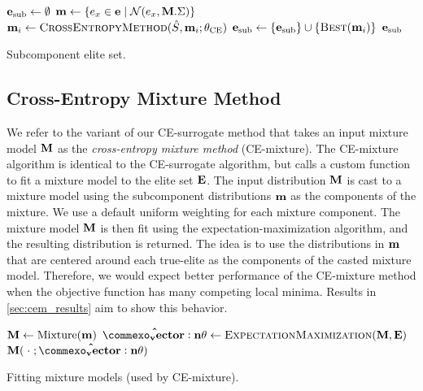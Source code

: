 \begin{algorithm}[ht]
  \begin{algorithmic}
    \State $\mathbf{e}_\text{sub} \leftarrow \emptyset$
    \State $\mathbf{m} \leftarrow \{ e_x \in \mathbf{e} \mid \operatorname{\mathcal{N}}(e_x, \mathbf{M}.\Sigma) \}$ 
        \State $\m_i \leftarrow \textproc{CrossEntropyMethod}(\surrogate, \m_i ; \theta_{\text{CE}})$ 
        \State $\e_\text{sub} \leftarrow \{\e_\text{sub}\} \cup \{\textproc{Best}(\m_i)\}$ 
    \EndFor
    \State \Return $\mathbf{e}_\text{sub}$
  \EndFunction
  \end{algorithmic}
  \caption{\label{alg:sub_elite_set} Subcomponent elite set.}
\end{algorithm}


\subsection{Cross-Entropy Mixture Method} \label{sec:cem_alg_ce_mixture}
We refer to the variant of our CE-surrogate method that takes an input mixture model $\mathbf{M}$ as the \textit{cross-entropy mixture method} (CE-mixture).
The CE-mixture algorithm is identical to the CE-surrogate algorithm, but calls a custom  function to fit a mixture model to the elite set $\mathbf{E}$.
The input distribution $\mathbf{M}$ is cast to a mixture model using the subcomponent distributions $\mathbf{m}$ as the components of the mixture.
We use a default uniform weighting for each mixture component.
The mixture model $\mathbf{M}$ is then fit using the expectation-maximization algorithm, and the resulting distribution is returned.
The idea is to use the distributions in $\mathbf{m}$ that are centered around each true-elite as the components of the casted mixture model.
Therefore, we would expect better performance of the CE-mixture method when the objective function has many competing local minima.
Results in \cref{sec:cem_results} aim to show this behavior.

\begin{algorithm}[ht]
  \begin{algorithmic}
    \State $\mathbf{M} \leftarrow \operatorname{Mixture}( \mathbf{m} )$
    \State $\mathbf{\hat{\vec{\theta}}} \leftarrow \textproc{ExpectationMaximization}(\M, \bfE)$
    \State \Return $\M(\;\cdot\;; \mathbf{\hat{\vec{\theta}}})$
  \EndFunction
  \end{algorithmic}
  \caption{\label{alg:ce_mixture_fit} Fitting mixture models (used by CE-mixture).}
\end{algorithm}


